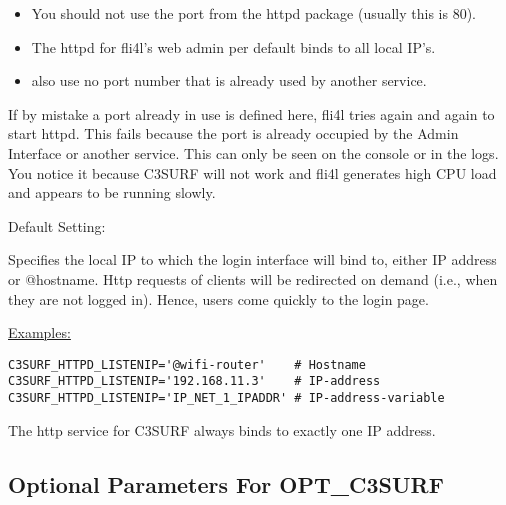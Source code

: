 \begin{itemize}
\begin{description}
  \begin{itemize}
  \item You should not use the port from the httpd package (usually this is 80).
  \item The httpd for fli4l's web admin per default binds to all local IP's.
  \item also use no port number that is already used by another service.\\
  \end{itemize}
  If by mistake a port already in use is defined here, fli4l tries again and again
  to start httpd. This fails because the port is already occupied by the Admin
  Interface or another service. This can only be seen on the console or in the logs.
  You notice it because C3SURF will not work and fli4l generates high CPU load
  and appears to be running slowly.


  Default Setting: 

  Specifies the local IP to which the login interface will bind to, either IP
  address or @hostname. Http requests of clients will be redirected on demand
  (i.e., when they are not logged in). Hence, users come quickly to the login page.

\underline{Examples:}
\begin{example}
\begin{verbatim}
C3SURF_HTTPD_LISTENIP='@wifi-router'    # Hostname
C3SURF_HTTPD_LISTENIP='192.168.11.3'    # IP-address
C3SURF_HTTPD_LISTENIP='IP_NET_1_IPADDR' # IP-address-variable
\end{verbatim}
\end{example}

The http service for C3SURF always binds to exactly one IP address.

\end{description}

\subsection {Optional Parameters For OPT\_C3SURF}

\begin{description}



\end{description}
\end{itemize}
